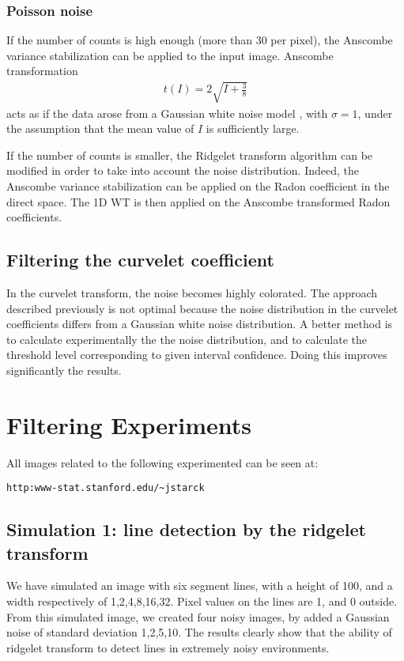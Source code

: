 \documentclass[11pt,a4paper]{article}
\begin{document}
\subsubsection{Poisson noise}
 If the number of counts is high enough (more than 30 per pixel), 
the Anscombe variance stabilization
\cite{rest:anscombe48} can be applied to the input image. 
Anscombe  transformation 
\cite{rest:anscombe48}
\begin{eqnarray}
t(I) = 2\sqrt{I + \frac{3}{8}}
\label{eqn_anscombe}
\end{eqnarray}
acts as if the data arose from a
Gaussian white noise model \cite{rest:anscombe48}, with $\sigma = 1$, under the
assumption that the mean value of $I$ is sufficiently large.

If the number of counts is smaller,
the Ridgelet transform algorithm can be modified in order to take
into account the noise distribution. Indeed, the Anscombe variance 
stabilization can be applied on the Radon coefficient in the direct
space. The 1D WT is then applied on the Anscombe transformed Radon coefficients.

\subsection{Filtering the curvelet coefficient}
 In the curvelet transform, the noise becomes highly colorated.
The approach described previously is not optimal because the
noise distribution in the curvelet coefficients 
differs from a Gaussian white noise distribution. A better method
is to calculate experimentally the the noise distribution, and to
calculate the threshold level corresponding to given interval confidence.
Doing this improves significantly the results.

\section{Filtering Experiments}
All images related to the following experimented can be seen at:
\begin{verbatim}
http:www-stat.stanford.edu/~jstarck
\end{verbatim}

\subsection{Simulation 1: line detection by the ridgelet transform}
We have simulated an image with six segment lines, with a height of 100, 
and a width respectively of 1,2,4,8,16,32.
Pixel values on the lines are 1, and 0 outside.
From this simulated image, we created four noisy images, by added a Gaussian
noise of standard deviation 1,2,5,10. 
The results clearly show that the ability of ridgelet transform to detect
lines in extremely noisy environments.
\end{document}
